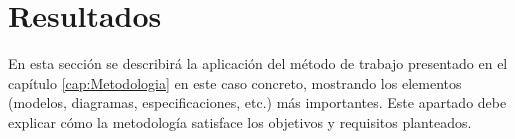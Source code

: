 \chapter{Resultados}
\label{cap:Resultados}

En esta sección se describirá la aplicación del método de trabajo presentado en el capítulo \ref{cap:Metodologia} en este caso concreto, mostrando los elementos (modelos, diagramas, especificaciones, etc.) más importantes. Este apartado debe explicar cómo la metodología satisface los objetivos y requisitos planteados.